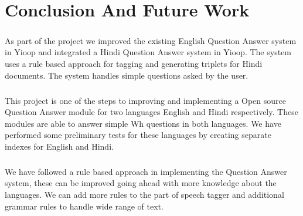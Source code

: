\chapter{Conclusion And Future Work}

\paragraph{}
As part of the project we improved the existing English Question Answer system in Yioop and integrated a Hindi Question Answer system in Yioop. The system uses a rule based approach for tagging and generating triplets for Hindi documents. The system handles simple questions asked by the user.

\paragraph{}
This project is one of the steps to improving and implementing a Open source Question Answer module for two languages English and Hindi respectively. These modules are able to answer simple Wh questions in both languages. We have performed some preliminary tests for these languages by creating separate indexes for English and Hindi. 

\paragraph{}
We have followed a rule based approach in implementing the Question Answer system, these can be improved going ahead with more knowledge about the languages. We can add more rules to the part of speech tagger and additional grammar rules to handle wide range of text.